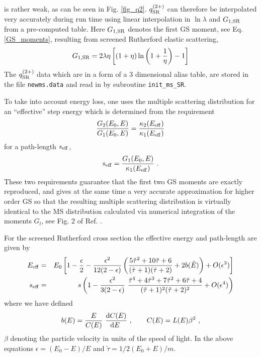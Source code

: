 is rather weak, as can be seen in Fig. \ref{fig_q2}.
$q^{(2+)}_{\rm SR}$ can therefore be interpolated
very accurately during run time using
linear interpolation in $\ln \lambda$ and $G_{1,{\rm SR}}$
from a pre-computed table.
Here $G_{1,{\rm SR}}$ denotes the first
GS moment, see Eq. \eqref{GS_moments}, resulting
from screened Rutherford elastic scattering,
\begin{equation}
\label{G1_SR}
G_{1,{\rm SR}} =
2 \lambda \eta \left[ (1 + \eta) \ln\left(1 + \frac{1}{\eta}\right) - 1
\right]
\end{equation}
The $q^{(2+)}_{\rm SR}$ data which are in a form of a 3 dimensional
alias table, are stored in the file {\tt newms.data} and read in
by subroutine {\tt init\_ms\_SR}.

To take into account energy loss, one uses the multiple scattering
distribution for an ``effective'' step energy which is
determined from the requirement \cite{Ka99a}
\begin{equation}
{G_2(E_0,E) \over G_1(E_0,E)} =
{\kappa_2(E_{\rm eff}) \over \kappa_1(E_{\rm eff})}
\end{equation}
for a path-length $s_{\rm eff}$,
\begin{equation}
s_{\rm eff} = {G_1(E_0,E) \over \kappa_1(E_{\rm eff})}~.
\end{equation}
These two requirements guarantee that the first two GS moments
are exactly reproduced, and gives at the same time a very accurate
approximation for higher order GS so that the resulting
multiple scattering distribution is virtually
identical to the MS distribution calculated via numerical integration
of the moments $G_l$, see Fig. 2 of Ref. \cite{Ka99a}.

For the screened Rutherford cross section the effective energy and
path-length are given by
\begin{eqnarray}
\label{E-eff}
E_{\rm eff} & = & E_0 \left[ 1 - {\epsilon \over 2} -
{\epsilon^2 \over 12 (2 - \epsilon)} \left(
{5 \tilde{\tau}^2 + 10 \tilde{\tau} + 6 \over (\tilde{\tau} + 1)
(\tilde{\tau} + 2)} + 2 b(\tilde{E}) \right) + O(\epsilon^3) \right]
\nonumber \\
s_{\rm eff} & = & s \left( 1 - {\epsilon^2 \over 3 ( 2 - \epsilon)}~
{\tilde{\tau}^4 + 4 \tilde{\tau}^3 + 7 \tilde{\tau}^2 + 6 \tilde{\tau}
+ 4 \over (\tilde{\tau} + 1)^2 (\tilde{\tau} + 2)^2} + O(\epsilon^4) \right)
\end{eqnarray}
where we have defined
\begin{equation}
\label{bE}
b(E) = {E \over C(E)}~
{{\rm d} C(E) \over {\rm d}E~}~,\quad \quad C(E) = L(E) \beta^2~,
\end{equation}
$\beta$ denoting the particle velocity in units of the speed of light.
In the above equations $\epsilon = (E_0 - E)/E$ and $\tilde{\tau} =
1/2 (E_0 + E)/m$.

